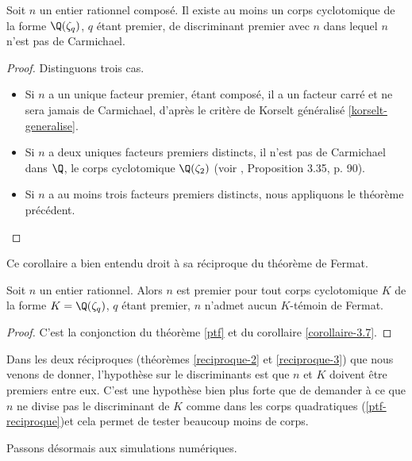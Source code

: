 \begin{corollaire}\label{corollaire-3.7}
	Soit $n$ un entier rationnel composé. Il existe au moins un corps cyclotomique de la forme $\Q(\zeta_q)$, $q$ étant premier, de discriminant premier avec $n$ dans lequel $n$ n'est pas de Carmichael.
\end{corollaire}

\begin{proof}
	Distinguons trois cas.
	\begin{itemize}
		\item Si $n$ a un unique facteur premier, étant composé, il a un facteur carré et ne sera jamais de Carmichael, d'après le critère de Korselt généralisé \ref{korselt-generalise}.
		\item Si $n$ a deux uniques facteurs premiers distincts, il n'est pas de Carmichael dans $\Q$, le corps cyclotomique $\Q(\zeta_2)$ (voir \cite{Demazure}, Proposition 3.35, p. 90).
		\item Si $n$ a au moins trois facteurs premiers distincts, nous appliquons le théorème précédent.
	\end{itemize}
\end{proof}

Ce corollaire a bien entendu droit à sa réciproque du théorème de Fermat.

\begin{theoreme}\label{reciproque-3}
	Soit $n$ un entier rationnel. Alors $n$ est premier \ssi pour tout corps cyclotomique $K$ de la forme $K = \Q(\zeta_q)$, $q$ étant premier, $n$ n'admet aucun $K$-témoin de Fermat.
\end{theoreme}

\begin{proof}
	C'est la conjonction du théorème \ref{ptf} et du corollaire \ref{corollaire-3.7}.
\end{proof}

\begin{remarque}
	Dans les deux réciproques (théorèmes \ref{reciproque-2} et \ref{reciproque-3}) que nous venons de donner, l'hypothèse sur le discriminants est que $n$ et $K$ doivent être premiers entre eux. C'est une hypothèse bien plus forte que de demander à ce que $n$ ne divise pas le discriminant de $K$ comme dans les corps quadratiques (\ref{ptf-reciproque})et cela permet de tester beaucoup moins de corps.
\end{remarque}

Passons désormais aux simulations numériques.

